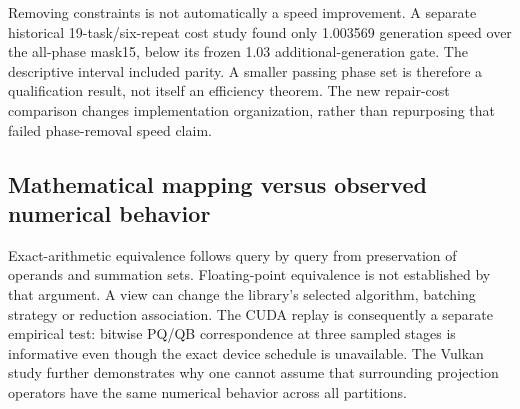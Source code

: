 Removing constraints is not automatically a speed improvement. A separate historical 19-task/six-repeat cost study found only 1.003569 generation speed over the all-phase mask15, below its frozen 1.03 additional-generation gate. The descriptive interval included parity. A smaller passing phase set is therefore a qualification result, not itself an efficiency theorem. The new repair-cost comparison changes implementation organization, rather than repurposing that failed phase-removal speed claim.

\subsection{Mathematical mapping versus observed numerical behavior}
Exact-arithmetic equivalence follows query by query from preservation of operands and summation sets. Floating-point equivalence is not established by that argument. A view can change the library's selected algorithm, batching strategy or reduction association. The CUDA replay is consequently a separate empirical test: bitwise PQ/QB correspondence at three sampled stages is informative even though the exact device schedule is unavailable. The Vulkan study further demonstrates why one cannot assume that surrounding projection operators have the same numerical behavior across all partitions.
